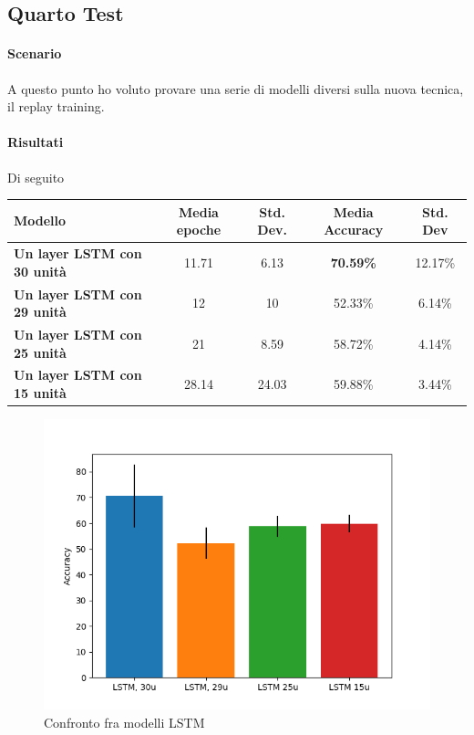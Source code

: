 \documentclass[11pt, a4paper, twoside, openright]{book}
\begin{document}
\subsection{Quarto Test}
\paragraph{Scenario} A questo punto ho voluto provare una serie di modelli diversi sulla nuova tecnica, il replay training.
\paragraph{Risultati} Di seguito\\
\begin{tabular}{l|c|c|c|c}
    \textbf{Modello} & \textbf{Media epoche} & \textbf{Std. Dev.} & \textbf{Media Accuracy} & \textbf{Std. Dev} \\
    \hline 
    \textbf{Un layer LSTM con 30 unità} & 11.71 & 6.13 & \textbf{70.59\%} & 12.17\% \\
    \textbf{Un layer LSTM con 29 unità} & 12 & 10 & 52.33\% & 6.14\%\\
    \textbf{Un layer LSTM con 25 unità} & 21 & 8.59 & 58.72\% & 4.14\%\\
    \textbf{Un layer LSTM con 15 unità} & 28.14 & 24.03 & 59.88\% & 3.44\%\\
\end{tabular}
\begin{figure}
    \centering
    \includegraphics[scale=0.75]{img/fourth.png}
    \caption{Confronto fra modelli LSTM}
    \label{fig:fourth}
\end{figure}
\end{document}
